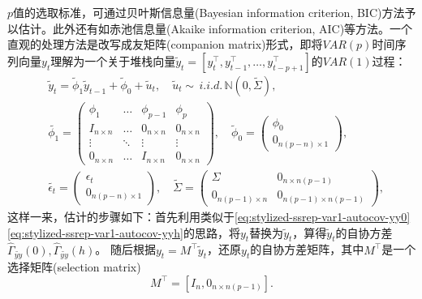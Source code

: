 $p$值的选取标准，可通过贝叶斯信息量(Bayesian information criterion, BIC)方法予以估计。此外还有如赤池信息量(Akaike information criterion, AIC)等方法。一个直观的处理方法是改写成友矩阵(companion matrix)形式，即将$VAR(p)$时间序列向量$y_{t}$理解为一个关于堆栈向量$\tilde{y}_{t} = \left[ y_{t}^{\top}, y_{t-1}^{\top}, \ldots, y_{t-p+1}^{\top} \right]$的$VAR(1)$过程：
\begin{equation}
  \label{sec:stylized-ssrep-empirics-varp-companion}
\begin{split}
    & \tilde{y}_{t} = \tilde{\phi}_{1} \tilde{y}_{t-1} + \tilde{\phi}_{0} + \tilde{u}_{t}, \quad \tilde{u}_{t} \sim \, i.i.d. \, \mathbb{N} \left( 0, \widetilde{\Sigma} \right),\\
    & \tilde{\phi_{1}} =
    \begin{pmatrix}
    \phi_{1} & \ldots & \phi_{p-1} & \phi_{p} \\
    I_{n \times n} & \ldots & 0_{n \times n} & 0_{n \times n} \\
    \vdots & \ddots & \vdots & \vdots \\
    0_{n \times n} & \ldots & I_{n \times n} & 0_{n \times n}
  \end{pmatrix},
  \quad \tilde{\phi}_{0} =
  \begin{pmatrix}
  \phi_{0} \\
  0_{n \left( p - n \right) \times 1}
  \end{pmatrix}, \\
  & \tilde{\epsilon_{t}} =
  \begin{pmatrix}
    \epsilon_{t} \\
    0_{n \left( p - n \right) \times 1}
  \end{pmatrix},
  \quad \widetilde{\Sigma} =
  \begin{pmatrix}
    \Sigma & 0_{n \times n \left( p - 1 \right)} \\
    0_{n \left( p - 1 \right) \times n} &
    0_{n \left( p - 1 \right) \times n \left( p - 1 \right)}
  \end{pmatrix},
\end{split}
\end{equation}
这样一来，估计的步骤如下：首先利用类似于\eqref{eq:stylized-ssrep-var1-autocov-yy0}\eqref{eq:stylized-ssrep-var1-autocov-yyh}的思路，将$y_{t}$替换为$\tilde{y}_{t}$，算得$\tilde{y}_{t}$的自协方差$\widehat{\Gamma}_{\widetilde{yy}}(0), \widehat{\Gamma}_{\widetilde{yy}}(h)$。
随后根据$y_{t} = M^{\top} \tilde{y}_{t}$，还原$y_{t}$的自协方差矩阵，其中$M^{\top}$是一个选择矩阵(selection matrix)
\begin{equation*}
  M^{\top} = \left[ I_{n}, 0_{n \times n \left( p - 1 \right)}\right].
\end{equation*}

